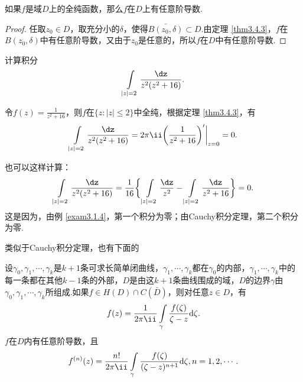 \begin{theorem}\label{thm3.4.4}
如果$f$是域$D$上的全纯函数，那么$f$在$D$上有任意阶导数.
\end{theorem}
\begin{proof}
任取$z_0\in D$，取充分小的$\delta$，使得$\bar{B(z_0,\delta)}\subset D$.由定理 \ref{thm3.4.3}，$f$在$B(z_0,\delta)$中有任意阶导数，又由于$z_0$是任意的，所以$f$在$D$中有任意阶导数.
\end{proof}

\begin{example}\label{exam3.4.5}
计算积分
\[\int\limits_{|z|=2}\frac{\dz}{z^2(z^2+16)}.\]
\end{example}
\begin{solution}
令$f(z)=\frac1{z^2+16}$，则$f$在$\{z:|z|\le2\}$中全纯，根据定理 \ref{thm3.4.3}，有
\[\int\limits_{|z|=2}\frac{\dz}{z^2(z^2+16)}=2\pi\ii
\bigg(\frac1{z^2+16}\bigg)'\bigg|_{z=0}=0.\]

也可以这样计算：
\[\int\limits_{|z|=2}\frac{\dz}{z^2(z^2+16)}=\frac1{16}
\bigg\{\int\limits_{|z|=2}\frac{\dz}{z^2}-\int\limits_{|z|=2}\frac{\dz}{z^2+16}\bigg\}=0.\]
这是因为，由例 \ref{exam3.1.4}，第一个积分为零；由Cauchy积分定理，第二个积分为零.
\end{solution}

类似于Cauchy积分定理，也有下面的
\begin{theorem}\label{thm3.4.6}
  设$\gamma_0,\gamma_1,\cdots,\gamma_k$是$k+1$条可求长简单闭曲线，$\gamma_1,\cdots,\gamma_k$都在$\gamma_0$的内部，$\gamma_1,\cdots,\gamma_k$中的每一条都在其他$k-1$条的外部，$D$是由这$k+1$条曲线围成的域，$D$的边界$\gamma$由$\gamma_0,\gamma_1,\cdots,\gamma_k$所组成.如果$f\in H(D)\cap C(\bar D)$，则对任意$z\in D$，有
  \[f(z)=\frac1{2\pi\ii}\int\limits_{\gamma}\frac{f(\zeta)}{\zeta-z}\textrm d\zeta.\]
$f$在$D$内有任意阶导数，且
\[f^{(n)}(z)=\frac{n!}{2\pi\ii}\int\limits_\gamma\frac{f(\zeta)}{(\zeta-z)^{n+1}}\textrm d\zeta,n=1,2,\cdots.\]
\end{theorem}

